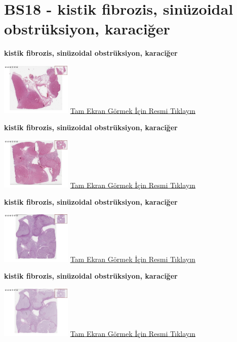 \documentclass[
  letterpaper,
  DIV=11,
  numbers=noendperiod]{scrreprt}
\begin{document}
\hypertarget{sec-BS18}{%
\section{BS18 - kistik fibrozis, sinüzoidal obstrüksiyon,
karaciğer}\label{sec-BS18}}

\textbf{kistik fibrozis, sinüzoidal obstrüksiyon, karaciğer}

\href{https://images.patolojiatlasi.com/BS18/HE1.html}{\includegraphics[width=0.25\textwidth,height=\textheight]{./screenshots/BS18-HE1_screenshot.png}}
\href{https://images.patolojiatlasi.com/BS18/HE1.html}{Tam Ekran Görmek
İçin Resmi Tıklayın}

\textbf{kistik fibrozis, sinüzoidal obstrüksiyon, karaciğer}

\href{https://images.patolojiatlasi.com/BS18/HE2.html}{\includegraphics[width=0.25\textwidth,height=\textheight]{./screenshots/BS18-HE2_screenshot.png}}
\href{https://images.patolojiatlasi.com/BS18/HE2.html}{Tam Ekran Görmek
İçin Resmi Tıklayın}

\textbf{kistik fibrozis, sinüzoidal obstrüksiyon, karaciğer}

\href{https://images.patolojiatlasi.com/BS18/PAS.html}{\includegraphics[width=0.25\textwidth,height=\textheight]{./screenshots/BS18-PAS_screenshot.png}}
\href{https://images.patolojiatlasi.com/BS18/PAS.html}{Tam Ekran Görmek
İçin Resmi Tıklayın}

\textbf{kistik fibrozis, sinüzoidal obstrüksiyon, karaciğer}

\href{https://images.patolojiatlasi.com/BS18/PASD.html}{\includegraphics[width=0.25\textwidth,height=\textheight]{./screenshots/BS18-PASD_screenshot.png}}
\href{https://images.patolojiatlasi.com/BS18/PASD.html}{Tam Ekran Görmek
İçin Resmi Tıklayın}
\end{document}
